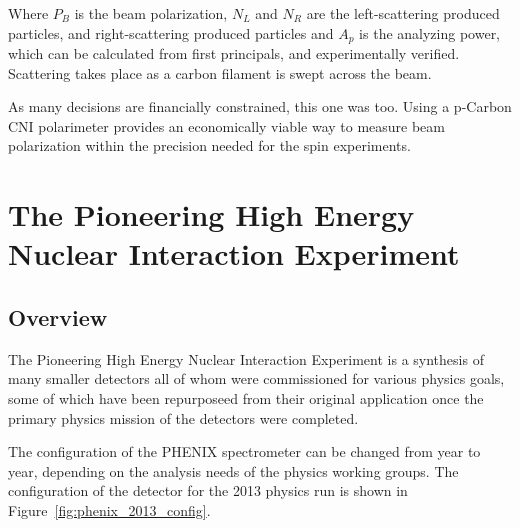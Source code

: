 Where $P_B$ is the beam polarization, $N_L$ and $N_R$ are the left-scattering
produced particles, and right-scattering produced particles and $A_p$ is the
analyzing power, which can be calculated from first principals, and
experimentally verified. Scattering takes place as a carbon filament is swept
across the beam.

As many decisions are financially constrained, this one was too. Using a
p-Carbon CNI polarimeter provides an economically viable way to measure beam
polarization within the precision needed for the spin experiments.


\clearpage
\section{The Pioneering High Energy Nuclear Interaction Experiment}
\label{sec:PHENIX}
\subsection{Overview}

The Pioneering High Energy Nuclear Interaction Experiment is a synthesis of many
smaller detectors all of whom were commissioned for various physics goals, some
of which have been repurposeed from their original application once the primary
physics mission of the detectors were completed.

The configuration of the PHENIX spectrometer can be changed from year to year,
depending on the analysis needs of the physics working groups. The configuration
of the detector for the 2013 physics run is shown in
Figure~\ref{fig:phenix_2013_config}.

